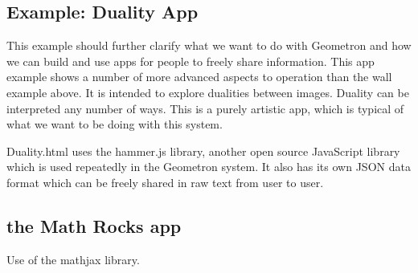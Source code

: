 \subsection{Example: Duality App}

This example should further clarify what we want to do with Geometron and how we can build and use apps for people to freely share information.  This app example shows a number of more advanced aspects to operation than the wall example above. It is intended to explore dualities between images.  Duality can be interpreted any number of ways.  This is a purely artistic app, which is typical of what we want to be doing with this system.  

Duality.html uses the hammer.js library, another open source JavaScript library which is used repeatedly in the Geometron system.  It also has its own JSON data format which can be freely shared in raw text from user to user. 

\subsection{the Math Rocks app}

Use of the mathjax library.